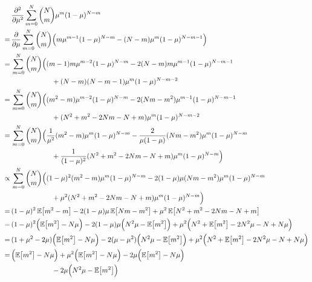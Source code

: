 \documentclass[11pt, a4paper]{scrartcl}
\newcommand{\E}{\mathbb{E}}
\begin{document}
			\begin{align}
				 &\, \pdv[2]{\mu} \sum_{m = 0}^{N} { N \choose m } \mu^m (1 - \mu)^{N - m} \\
				=&\, \pdv{\mu} \sum_{m = 0}^{N} { N \choose m } \Big(
						  m \mu^{m - 1} (1 - \mu)^{N - m}
						- (N - m) \mu^m (1 - \mu)^{N - m - 1}
					\Big) \\
				=&\, \sum_{m = 0}^{N} { N \choose m } \Big(
						  (m - 1) m \mu^{m - 2} (1 - \mu)^{N - m}
						- 2 (N - m) m \mu^{m - 1} (1 - \mu)^{N - m - 1} \\&\qquad\qquad\qquad
						+ (N - m) (N - m - 1) \mu^m (1 - \mu)^{N - m - 2} \\
				=&\, \sum_{m = 0}^{N} { N \choose m } \Big(
						  (m^2 - m) \mu^{m - 2} (1 - \mu)^{N - m}
						- 2 (Nm - m^2) \mu^{m - 1} (1 - \mu)^{N - m - 1} \\&\qquad\qquad\qquad
						+ (N^2 + m^2 - 2Nm - N + m) \mu^m (1 - \mu)^{N - m - 2} \\
				=&\, \sum_{m = 0}^{N} { N \choose m } \Big(
						  \frac{1}{\mu^2} (m^2 - m) \mu^m (1 - \mu)^{N - m}
						- \frac{2}{\mu (1 - \mu)} (Nm - m^2) \mu^m (1 - \mu)^{N - m} \\&\qquad\qquad\qquad
						+ \frac{1}{(1 - \mu)^2} (N^2 + m^2 - 2Nm - N + m) \mu^m (1 - \mu)^{N - m}
					\Big) \\
				\propto&\, \sum_{m = 0}^{N} { N \choose m } \Big(
						  (1 - \mu)^2 (m^2 - m) \mu^m (1 - \mu)^{N - m}
						- 2 (1 - \mu) \mu (Nm - m^2) \mu^m (1 - \mu)^{N - m} \\&\qquad\qquad\qquad
						+ \mu^2 (N^2 + m^2 - 2Nm - N + m) \mu^m (1 - \mu)^{N - m}
					\Big) \\
				=&\,  (1 - \mu)^2 \, \E\big[ m^2 - m \big]
					- 2 (1 - \mu) \mu \, \E\big[ Nm - m^2 \big]
					+ \mu^2 \, \E\big[ N^2 + m^2 - 2Nm - N + m \big] \\
				=&\,  (1 - \mu)^2 \Big( \E\big[m^2\big] - N\mu \Big)
					- 2 (1 - \mu) \mu \Big( N^2 \mu - \E\big[m^2\big] \Big)
					+ \mu^2 \Big( N^2 + \E\big[m^2\big] - 2 N^2 \mu - N + N \mu \Big) \\
				=&\,  (1 + \mu^2 - 2 \mu) \Big( \E\big[m^2\big] - N\mu \Big)
					- 2 (\mu - \mu^2) \Big( N^2 \mu - \E\big[m^2\big] \Big)
					+ \mu^2 \Big( N^2 + \E\big[m^2\big] - 2 N^2 \mu - N + N \mu \Big) \\
				=&\,  \Big( \E\big[m^2\big] - N\mu \Big)
					+ \mu^2 \Big( \E\big[m^2\big] - N\mu \Big)
					- 2 \mu \Big( \E\big[m^2\big] - N\mu \Big) \\&\qquad\qquad\qquad
					- 2 \mu \Big( N^2 \mu - \E\big[m^2\big] \Big)

\end{align}
\end{document}
